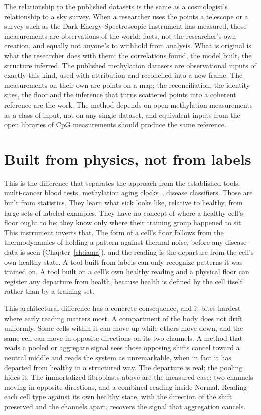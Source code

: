 The relationship to the published datasets is the same as a cosmologist's relationship to a sky survey. When a researcher uses the points
a telescope or a survey such as the Dark Energy Spectroscopic Instrument has measured, those measurements are observations of the world:
facts, not the researcher's own creation, and equally not anyone's to withhold from analysis. What is original is what the researcher does
with them: the correlations found, the model built, the structure inferred. The published methylation datasets are observational inputs of
exactly this kind, used with attribution and reconciled into a new frame. The measurements on their own are points on a map; the
reconciliation, the identity sites, the floor and the inference that turns scattered points into a coherent reference are the work. The
method depends on open methylation measurements as a class of input, not on any single dataset, and equivalent inputs from the open
libraries of CpG measurements should produce the same reference. \interp

\section{Built from physics, not from labels}\label{sec:ag_physics}

This is the difference that separates the approach from the established tools: multi-cancer blood tests, methylation aging
clocks~\cite{Horvath2013}, disease classifiers. Those are built from statistics. They learn what sick looks like, relative to healthy,
from large sets of labeled examples. They have no concept of where a healthy cell's floor ought to be; they know only where their
training group happened to sit. This instrument inverts that. The form of a cell's floor follows from the thermodynamics of holding
a pattern against thermal noise, before any disease data is seen (Chapter~\ref{ch:iama}), and the reading is the departure from the
cell's own healthy state. A tool built from labels can only recognize patterns it was trained on. A tool built on a cell's own healthy
reading and a physical floor can register any departure from health, because health is defined by the cell itself rather than by a
training set. \interp

This architectural difference has a concrete consequence, and it bites hardest where early reading matters most. A compartment of the
body does not drift uniformly. Some cells within it can move up while others move down, and the same cell can move in opposite directions
on its two channels. A method that reads a pooled or aggregate signal sees those opposing shifts cancel toward a neutral middle and reads
the system as unremarkable, when in fact it has departed from healthy in a structured way. The departure is real; the pooling hides it.
The immortalized fibroblasts above are the measured case: two channels moving in opposite directions, and a combined reading inside
Normal. \measured{} Reading each cell type against its own healthy state, with the direction of the shift preserved and the channels
apart, recovers the signal that aggregation cancels. \derived

